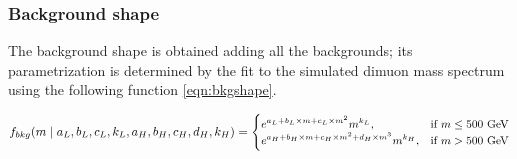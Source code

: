 \subsubsection{Background shape} 
The background shape is obtained adding all the backgrounds; its parametrization is determined by the fit to the simulated  dimuon mass spectrum using the following function \ref{eqn:bkgshape}.

\begin{equation}
\begin{small}
f_{bkg}(m\mid a_{L}, b_{L}, c_{L}, k_{L}, a_{H}, b_{H}, c_{H}, d_{H}, k_{H}) = \begin{cases}
e^{a_{L} + b_{L}\times m + c_{L}\times m^2}m^{k_{L}}, & \mbox{if }m \le \mbox{500 GeV} \\
e^{a_{H} + b_{H}\times m + c_{H}\times m^2 + d_{H}\times m^3}m^{k_{H}}, & \mbox{if }m > \mbox{500 GeV} \end{cases}
\end{small}
\label{eqn:bkgshape}
\end{equation}

